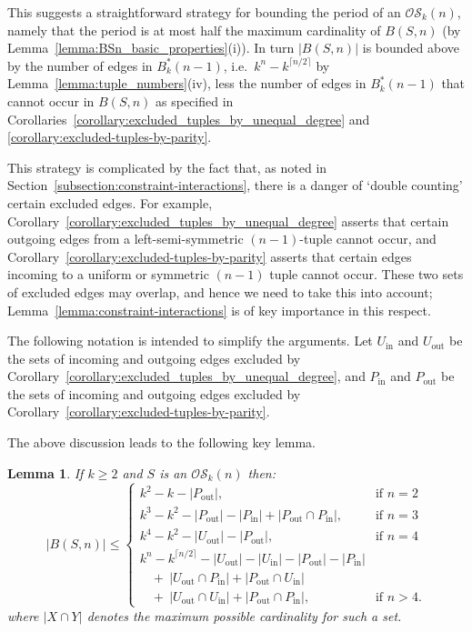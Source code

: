 \documentclass[a4paper,11pt]{article}
\newtheorem{lemma}{Lemma}[section]
\begin{document}
This suggests a straightforward strategy for bounding the period of an $\mathcal{OS}_k(n)$, namely
that the period is at most half the maximum cardinality of $B(S,n)$ (by
Lemma~\ref{lemma:BSn_basic_properties}(i)).  In turn $|B(S,n)|$ is bounded above by the number of
edges in $B^*_k(n-1)$, i.e.\ $k^n-k^{\lceil n/2\rceil}$ by Lemma~\ref{lemma:tuple_numbers}(iv),
less the number of edges in $B^*_k(n-1)$ that cannot occur in $B(S,n)$ as specified in
Corollaries~\ref{corollary:excluded_tuples_by_unequal_degree} and
\ref{corollary:excluded-tuples-by-parity}.

This strategy is complicated by the fact that, as noted in
Section~\ref{subsection:constraint-interactions}, there is a danger of `double counting' certain
excluded edges.  For example, Corollary~\ref{corollary:excluded_tuples_by_unequal_degree} asserts
that certain outgoing edges from a left-semi-symmetric $(n-1)$-tuple cannot occur, and
Corollary~\ref{corollary:excluded-tuples-by-parity} asserts that certain edges incoming to a
uniform or symmetric $(n-1)$ tuple cannot occur.  These two sets of excluded edges may overlap, and
hence we need to take this into account; Lemma~\ref{lemma:constraint-interactions} is of key
importance in this respect.

The following notation is intended to simplify the arguments.  Let $U_{\text{in}}$ and
$U_{\text{out}}$ be the sets of incoming and outgoing edges excluded by
Corollary~\ref{corollary:excluded_tuples_by_unequal_degree}, and $P_{\text{in}}$ and
$P_{\text{out}}$ be the sets of incoming and outgoing edges excluded by
Corollary~\ref{corollary:excluded-tuples-by-parity}.

The above discussion leads to the following key lemma.

\begin{lemma}  \label{lemma:bounds-high-level}
If $k\geq2$ and $S$ is an $\mathcal{OS}_k(n)$ then:
\[ |B(S,n)|\leq \begin{cases}
k^2-k - |P_{\text{out}}|,
 & \text{if $n=2$} \\
k^3-k^2 - |P_{\text{out}}|-|P_{\text{in}}| + |P_{\text{out}}\cap P_{\text{in}}|,
 & \text{if $n=3$} \\
k^4-k^2 - |U_{\text{out}}|-|P_{\text{out}}|,
 & \text{if $n=4$} \\
k^n-k^{\lceil n/2\rceil} - |U_{\text{out}}|-|U_{\text{in}}|-|P_{\text{out}}|-|P_{\text{in}}| \\
~~~~+~|U_{\text{out}}\cap P_{\text{in}}|+|P_{\text{out}}\cap U_{\text{in}}| \\
~~~~+~|U_{\text{out}}\cap U_{\text{in}}|+|P_{\text{out}}\cap P_{\text{in}}|,
 & \text{if $n>4$.}
\end{cases} \]
where $|X\cap Y|$ denotes the maximum possible cardinality for such a set.
\end{lemma}
\end{document}
